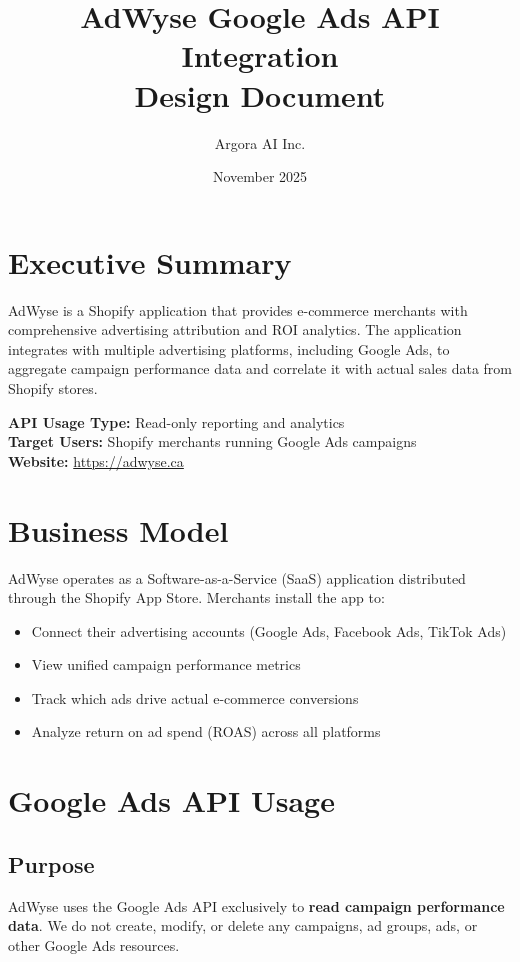 \documentclass[11pt,a4paper]{article}
\title{AdWyse Google Ads API Integration\\Design Document}
\author{Argora AI Inc.}
\date{November 2025}
\begin{document}
\maketitle

\section{Executive Summary}

AdWyse is a Shopify application that provides e-commerce merchants with comprehensive advertising attribution and ROI analytics. The application integrates with multiple advertising platforms, including Google Ads, to aggregate campaign performance data and correlate it with actual sales data from Shopify stores.

\textbf{API Usage Type:} Read-only reporting and analytics\\
\textbf{Target Users:} Shopify merchants running Google Ads campaigns\\
\textbf{Website:} \url{https://adwyse.ca}

\section{Business Model}

AdWyse operates as a Software-as-a-Service (SaaS) application distributed through the Shopify App Store. Merchants install the app to:

\begin{itemize}
    \item Connect their advertising accounts (Google Ads, Facebook Ads, TikTok Ads)
    \item View unified campaign performance metrics
    \item Track which ads drive actual e-commerce conversions
    \item Analyze return on ad spend (ROAS) across all platforms
\end{itemize}

\section{Google Ads API Usage}

\subsection{Purpose}
AdWyse uses the Google Ads API exclusively to \textbf{read campaign performance data}. We do not create, modify, or delete any campaigns, ad groups, ads, or other Google Ads resources.
\end{document}
